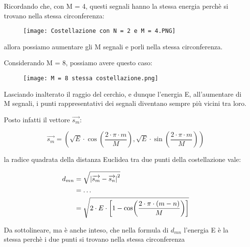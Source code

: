 Ricordando che, con M = 4, questi segnali hanno la stessa energia perchè si trovano nella stessa circonferenza: 

\begin{figure}[h]
    \centering
    \texttt{[image: Costellazione con N = 2 e M = 4.PNG]}
\end{figure}

allora possiamo aumentare gli M segnali e porli nella stessa circonferenza. \newline 

Considerando M = 8, possiamo avere questo caso: 

\begin{figure}[h]
    \centering
    \texttt{[image: M = 8 stessa costellazione.png]}
\end{figure}

Lasciando inalterato il raggio del cerchio, e dunque l'energia E, all'aumentare di M segnali, 
i punti rappresentativi dei segnali diventano sempre più vicini tra loro. \newline 

Posto infatti il vettore $\overrightarrow{s_m}$: 

{
    \Large 
    \begin{equation}
        \overrightarrow{s_m} 
        = 
        \left(\sqrt{E} \cdot \cos(\frac{2 \cdot \pi \cdot m}{M}), \sqrt{E} \cdot \sin(\frac{2 \cdot \pi \cdot m}{M})\right)
    \end{equation}
}

la radice quadrata della distanza Euclidea tra due punti della costellazione vale: 

{
    \Large 
    \begin{equation}
        \begin{split}
            d_{mn}
            &= 
            \sqrt{\abs{\overrightarrow{s_m} - \overrightarrow{s_n}}^{2}}
            \\
            &= 
            \dots 
            \\
            &= 
            \sqrt{2 \cdot E \cdot \left[ 1 - \cos(\frac{2 \cdot \pi \cdot (m - n)}{M})\right]}
        \end{split}
    \end{equation}
}

\begin{tcolorbox}
Da sottolineare, ma è anche inteso, che nella formula di $d_{mn}$ l'energia E è la stessa perchè i due punti si trovano nella stessa circonferenza   
\end{tcolorbox}

